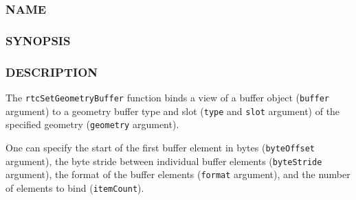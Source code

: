 \subsubsection{NAME}\label{name}

\begin{Shaded}
\begin{Highlighting}[]
\OperatorTok{{-}}
\end{Highlighting}
\end{Shaded}

\subsubsection{SYNOPSIS}\label{synopsis}

\begin{Shaded}
\begin{Highlighting}[]

\OperatorTok{(}
\OperatorTok{,}
  \OperatorTok{,}
   \OperatorTok{,}
  \OperatorTok{,}
\OperatorTok{,}
  \OperatorTok{,}
  \OperatorTok{,}
\OperatorTok{);}
\end{Highlighting}
\end{Shaded}

\subsubsection{DESCRIPTION}\label{description}

The \texttt{rtcSetGeometryBuffer} function binds a view of a buffer
object (\texttt{buffer} argument) to a geometry buffer type and slot
(\texttt{type} and \texttt{slot} argument) of the specified geometry
(\texttt{geometry} argument).

One can specify the start of the first buffer element in bytes
(\texttt{byteOffset} argument), the byte stride between individual
buffer elements (\texttt{byteStride} argument), the format of the buffer
elements (\texttt{format} argument), and the number of elements to bind
(\texttt{itemCount}).

